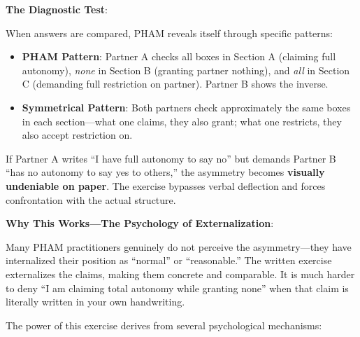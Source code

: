 \documentclass[12pt, letterpaper]{article}
\begin{document}
\textbf{The Diagnostic Test}:

When answers are compared, PHAM reveals itself through specific patterns:

\begin{itemize}
    \item \textbf{PHAM Pattern}: Partner A checks all boxes in Section A (claiming full autonomy), \textit{none} in Section B (granting partner nothing), and \textit{all} in Section C (demanding full restriction on partner). Partner B shows the inverse.
    
    \item \textbf{Symmetrical Pattern}: Both partners check approximately the same boxes in each section---what one claims, they also grant; what one restricts, they also accept restriction on.
\end{itemize}

If Partner A writes ``I have full autonomy to say no'' but demands Partner B ``has no autonomy to say yes to others,'' the asymmetry becomes \textbf{visually undeniable on paper}. The exercise bypasses verbal deflection and forces confrontation with the actual structure.

\textbf{Why This Works---The Psychology of Externalization}:

Many PHAM practitioners genuinely do not perceive the asymmetry---they have internalized their position as ``normal'' or ``reasonable.'' The written exercise externalizes the claims, making them concrete and comparable. It is much harder to deny ``I am claiming total autonomy while granting none'' when that claim is literally written in your own handwriting.

The power of this exercise derives from several psychological mechanisms:
\end{document}
